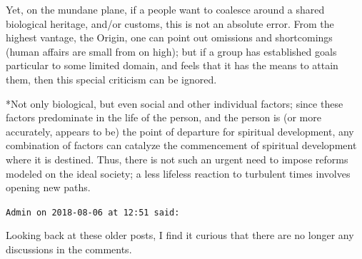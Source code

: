 \begin{footnotesize}
\begin{sffamily}
Yet, on the mundane plane, if a people want to coalesce around a shared biological heritage, and/or customs, this is not an absolute error. From the highest vantage, the Origin, one can point out omissions and shortcomings (human affairs are small from on high); but if a group has established goals particular to some limited domain, and feels that it has the means to attain them, then this special criticism can be ignored.

*Not only biological, but even social and other individual factors; since these factors predominate in the life of the person, and the person is (or more accurately, appears to be) the point of departure for spiritual development, any combination of factors can catalyze the commencement of spiritual development where it is destined. Thus, there is not such an urgent need to impose reforms modeled on the ideal society; a less lifeless reaction to turbulent times involves opening new paths.

\hfill

\texttt{Admin on 2018-08-06 at 12:51 said:}

Looking back at these older posts, I find it curious that there are no longer any discussions in the comments.


\hfill

\end{sffamily}
\end{footnotesize}

